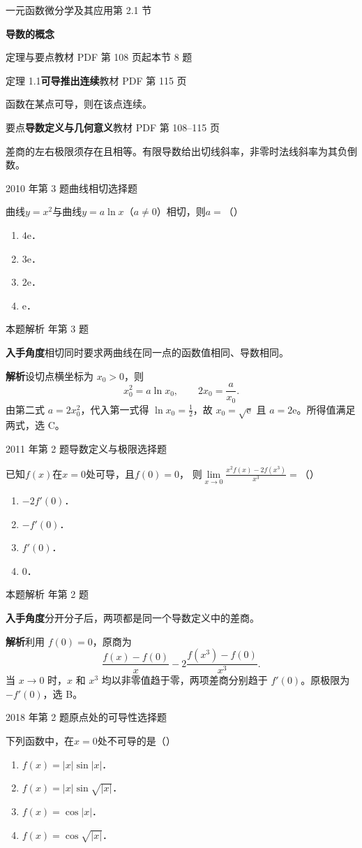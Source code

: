 \documentclass[UTF8,zihao=-4,fontset=fandol]{ctexart}
\renewcommand{\lim}{\operatorname*{lim}\limits}
\newcommand{\SectionHeading}[4]{%
  \clearpage\hypertarget{sec-#1}{}%
  {\small\textcolor{accent}{#2\hfill 第 #1 节}}\par\medskip
  {\LARGE\bfseries #3}\par\smallskip
  {\small\textcolor{muted}{#4}}\par\bigskip}
\newcommand{\Theory}[4]{%
  {\small\textcolor{accent}{#1}\quad\textbf{#3}\hfill\textcolor{muted}{教材 PDF 第 #2 页}}\par
  {\small #4}\par\smallskip}
\newcommand{\pickout}{\hfill（\hspace{1.4em}）}
\newenvironment{abcd}{\begin{enumerate}[label=\textup{(\Alph*)},leftmargin=2.3em,itemsep=1pt,topsep=4pt,parsep=1pt]}{\end{enumerate}}
\newcommand{\QuestionPage}[6]{%
  \par\noindent\begin{minipage}{\linewidth}
  \raggedright
  {\small\textcolor{black!60}{#3\quad #5}\hfill\textcolor{accent}{#2}}\par\smallskip}
\newcommand{\QuestionEnd}{\end{minipage}\par\medskip}
\newcommand{\QuestionPage}[6]{%
  \clearpage
  {\small\textcolor{accent}{#1\hfill #2}}\par\medskip
  {\small\textcolor{black!60}{#3\quad #5\hfill #6}}\par\vspace{9bp}}
\newcommand{\QuestionEnd}{}
\newenvironment{QuestionSolution}[1]{%
  \clearpage
  {\small\textcolor{black!60}{本题解析\quad #1}}\par\medskip
}{\par\clearpage}
\begin{document}
\SectionHeading{2.1}{一元函数微分学及其应用}{导数的概念}{定理与要点\quad 教材 PDF 第 108 页起\hfill 本节 8 题}
\Theory{定理 1.1}{115}{可导推出连续}{函数在某点可导，则在该点连续。}
\Theory{要点}{108--115}{导数定义与几何意义}{差商的左右极限须存在且相等。有限导数给出切线斜率，非零时法线斜率为其负倒数。}
\QuestionPage{2.1 导数的概念}{选择题}{2010 年第 3 题}{1}{曲线相切}{048 / 234}
曲线$y = x^2$与曲线$y = a\ln x$（$a \ne 0$）相切，则$a =$\pickout{}
\begin{abcd}
\item $4\mathrm{e}$．
\item $3\mathrm{e}$．
\item $2\mathrm{e}$．
\item $\mathrm{e}$．
\end{abcd}
\QuestionEnd

\begin{QuestionSolution}{2010 年第 3 题}
\textbf{入手角度}\quad 相切同时要求两曲线在同一点的函数值相同、导数相同。

\textbf{解析}\quad 设切点横坐标为 \(x_0>0\)，则
\[
x_0^2=a\ln x_0,\qquad 2x_0=\frac{a}{x_0}.
\]
由第二式 \(a=2x_0^2\)，代入第一式得 \(\ln x_0=\frac{1}{2}\)，故 \(x_0=\sqrt{\mathrm{e}}\) 且 \(\boxed{a=2\mathrm{e}}\)。所得值满足两式，选 C。
\end{QuestionSolution}

\QuestionPage{2.1 导数的概念}{选择题}{2011 年第 2 题}{1}{导数定义与极限}{049 / 234}
已知$f(x)$在$x = 0$处可导，且$f(0) = 0$，
则$\lim_{x \to 0} \frac{x^2 f(x) - 2f\left(x^3 \right)}{x^3} =$\pickout{}
\begin{abcd}
\item $- 2f'(0)$．
\item $- f'(0)$．
\item $f'(0)$．
\item $0$．
\end{abcd}
\QuestionEnd

\begin{QuestionSolution}{2011 年第 2 题}
\textbf{入手角度}\quad 分开分子后，两项都是同一个导数定义中的差商。

\textbf{解析}\quad 利用 \(f(0)=0\)，原商为
\[
\frac{f(x)-f(0)}x-2\frac{f(x^3)-f(0)}{x^3}.
\]
当 \(x\to0\) 时，\(x\) 和 \(x^3\) 均以非零值趋于零，两项差商分别趋于 \(f'(0)\)。原极限为 \(-f'(0)\)，选 B。
\end{QuestionSolution}

\QuestionPage{2.1 导数的概念}{选择题}{2018 年第 2 题}{1}{原点处的可导性}{050 / 234}
下列函数中，在$x = 0$处不可导的是\pickout{}
\begin{abcd}
\item $f(x) = |x|\sin |x|$．
\item $f(x) = |x|\sin \sqrt{|x|}$．
\item $f(x) = \cos |x|$．
\item $f(x) = \cos \sqrt{|x|}$．
\end{abcd}
\QuestionEnd
\end{document}
